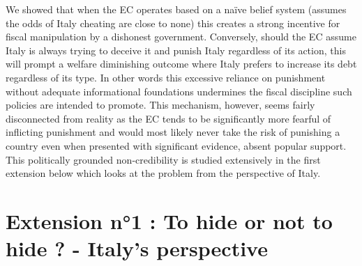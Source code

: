 \documentclass{article}
\begin{document}
 We showed that when the EC operates based on a naïve belief system (assumes the odds of Italy cheating are close to none) this creates a strong incentive for fiscal manipulation by a dishonest government. Conversely, should the EC assume Italy is always trying to deceive it and punish Italy regardless of its action, this will prompt a welfare diminishing outcome where Italy prefers to increase its debt regardless of its type. In other words this excessive reliance on punishment without adequate informational foundations undermines the fiscal discipline such policies are intended to promote. This mechanism, however, seems fairly disconnected from reality as the EC tends to be significantly more fearful of inflicting punishment and would most likely never take the risk of punishing a country even when presented with significant evidence, absent popular support. This politically grounded non-credibility is studied extensively in the first extension below which looks at the problem from the perspective of Italy. 



\section{Extension n°1 : To hide or not to hide ? - Italy's perspective}
\end{document}
